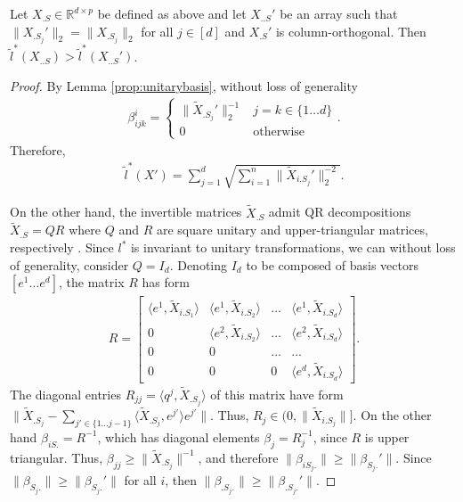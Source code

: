 \documentclass[a4paper,11pt]{article}
\begin{document}
\begin{proposition}
\label{lemma:orthogonal}
Let $X_{.S} \in \mathbb R^{d \times p}$ be defined as above and let $X_{..S}'$ be an array such that $\|X_{.S_j}'\|_2 = \|X_{.S_j}\|_2$ for all $j \in [d]$ and $X_{.S}'$ is column-orthogonal.
Then $\tilde l^* (X_{..S}) > \tilde l^* (X_{..S}')$.
\end{proposition}
\begin{proof}

By Lemma \ref{prop:unitarybasis}, without loss of generality
\begin{eqnarray}
\beta_{ijk}^i = \begin{cases} \|\tilde X_{.S_j}'\|_2^{-1} & j = k \in \{ 1 \dots d\}  \\
0 & \text{otherwise}
\end{cases}.
\end{eqnarray}
Therefore,
\begin{eqnarray}
\tilde l^*(X') = \sum_{j = 1}^d \sqrt{\sum_{i = 1}^n \|\tilde X_{i.S_j}' \|_2^{-2}}.
\end{eqnarray}

On the other hand, the invertible matrices $\tilde X_{.S}$ admit QR decompositions $\tilde X_{.S} = QR$ where $Q$ and $R$ are square unitary and upper-triangular matrices, respectively \cite{Anderson1992-fb}.
Since $l^*$ is invariant to unitary transformations, we can without loss of generality, consider $Q= I_d$.
Denoting $I_d$ to be composed of basis vectors $[e^1 \dots e^d]$, the matrix $R$ has form
\begin{eqnarray}
R = \begin{bmatrix}
\langle e^1, \tilde X_{i.{S_1}} \rangle & \langle e^1, \tilde X_{i.{S_2}} \rangle  &\dots &  \langle e^1, \tilde X_{i.{S_d}} \rangle \\
0 & \langle e^2, \tilde X_{i.{S_2}} \rangle & \dots  &  \langle e^2, \tilde X_{i.{S_d}} \rangle\\
0 & 0 & \dots & \dots  \\
0 & 0 & 0& \langle e^d, \tilde X_{i.{S_d}} \rangle 
\end{bmatrix}.
\end{eqnarray}
The diagonal entries $R_{jj} = \langle q^j, \tilde X_{.{S_j}} \rangle$ of this matrix have form $\| \tilde X_{.{S_j}} -  \sum_{j' \in \{1 \dots j-1\}} \langle \tilde X_{.{S_{j}}}, e^{j'} \rangle e^{j'} \|$.
Thus, $R_{j} \in (0, \| \tilde X_{i.{S_j}}\|]$.
On the other hand $\beta_{iS.} =R^{-1}$, which has diagonal elements $\beta_{j} = R_{j}^{-1}$, since $R$ is upper triangular.
Thus, $\beta_{jj} \geq \| \tilde X_{.{S_j}}\|^{-1}$, and therefore $\|\beta_{iS_j.}\| \geq \|\beta_{S_j.}'\|.$
Since $\|\beta_{S_j.}\| \geq \|\beta_{S_j.}'\|$ for all $i$, then $\|\beta_{.S_j.}\| \geq \|\beta_{.S_j.}' \|$.
\end{proof}
\end{document}
